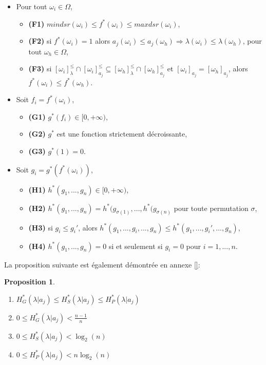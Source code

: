 \documentclass[a4paper]{article}
\newtheorem{prop}{Proposition}
\begin{document}
\begin{itemize}
    \item Pour tout $\omega_i \in \Omega$,
    \begin{itemize}
        \item \textbf{(F1)} $mindsr(\omega_i) \leq f^*(\omega_i) \leq maxdsr(\omega_i)$,
        \item \textbf{(F2)} si $f^*(\omega_i) = 1$ alors $a_j(\omega_i) \leq a_j(\omega_h)
            \Rightarrow \lambda(\omega_i) \leq \lambda(\omega_h)$, pour tout
            $\omega_h \in \Omega$,
        \item \textbf{(F3)} si $[\omega_i]^{\leq}_{\lambda} \cap [\omega_i]^{\leq}_{a_j} \subseteq
        [\omega_h]^{\leq}_{\lambda} \cap [\omega_h]^{\leq}_{a_j}$ et
        $[\omega_i]_{a_j} = [\omega_h]_{a_j}$, alors $f^*(\omega_i) \leq
        f^*(\omega_h)$. 
    \end{itemize}

    \item Soit $f_i = f^*(\omega_i)$,
    \begin{itemize}
        \item \textbf{(G1)} $g^*(f_i) \in [0, +\infty)$,
        \item \textbf{(G2)} $g^*$ est une fonction strictement décroissante,
        \item \textbf{(G3)} $g^*(1) = 0$.
    \end{itemize}

    \item Soit $g_i = g^*(f^*(\omega_i))$,
    \begin{itemize}
        \item \textbf{(H1)} $h^*(g_1,...,g_n) \in [0, +\infty)$,
        \item \textbf{(H2)} $h^*(g_1,...,g_n) = h^*(g_{\sigma
            (1)},...,h^*(g_{\sigma (n)}$ pour toute permutation $\sigma$,
        \item \textbf{(H3)} si $g_i \leq g_i'$, alors $h^*(g_1,...,g_i,...,g_n)
            \leq h^*(g_1,...,g_i',...,g_n)$, 
        \item \textbf{(H4)} $h^*(g_1,...,g_n) = 0$ si et seulement si $g_i = 0$
            pour $i=1,...,n$.
    \end{itemize}
\end{itemize}

La proposition suivante est également démontrée en annexe \ref{}: 

\begin{prop}
    \begin{enumerate}
        \item $H^*_G(\lambda|a_j) \leq H^*_S(\lambda|a_j) \leq
            H^*_P(\lambda|a_j)$
        \item $0 \leq H^*_G(\lambda|a_j) < \frac{n-1}{n}$
        \item $0 \leq H^*_S(\lambda|a_j) < \log_{2}(n)$
        \item $0 \leq H^*_P(\lambda|a_j) < n \log_{2}(n)$
    \end{enumerate}
\label{prop:prop1}
\end{prop}
\end{document}
